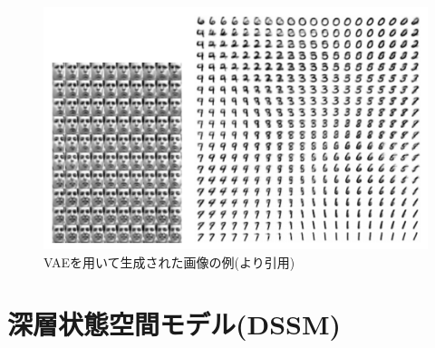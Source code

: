 \begin{figure}[tbp]
  \begin{center}
    \includegraphics[width=\linewidth]{./figures/vae.png}
    \caption{VAEを用いて生成された画像の例(\cite{vae}より引用)}
    \label{fig:vae}
  \end{center}
\end{figure}

\section{深層状態空間モデル(DSSM)}
\label{section:DSSM}